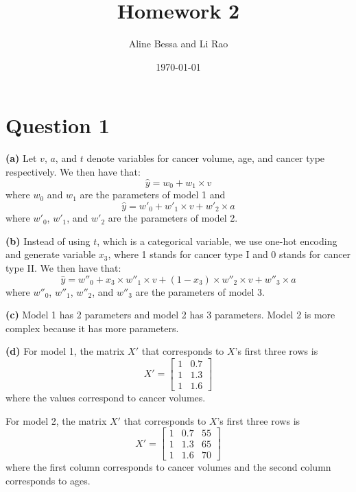 \documentclass[leqno]{article}
\title{Homework 2}
\author{Aline Bessa and Li Rao}
\date\today
\begin{document}
\maketitle %

\section*{Question 1}

\textbf{(a)} Let $v$, $a$, and $t$ denote variables for cancer volume, age, and cancer type respectively. We then have that:
\begin{equation*}
\hat{y} = w_0 + w_1 \times v
\end{equation*}
where $w_0$ and $w_1$ are the parameters of model 1 and
\begin{equation*}
\hat{y} = w'_0 + w'_1 \times v + w'_2 \times a
\end{equation*}
where $w'_0$, $w'_1$, and $w'_2$ are the parameters of model 2.

\hfill

\noindent \textbf{(b)} Instead of using $t$, which is a categorical variable, we use one-hot encoding and generate variable $x_3$, where 1 stands for cancer type I and 
0 stands for cancer type II. We then have that:
\begin{equation*}
\hat{y} = w''_0 + x_3 \times w''_1 \times v + (1 - x_3) \times w''_2 \times v  + w''_3 \times a 
\end{equation*}
where $w''_0$, $w''_1$, $w''_2$, and $w''_3$ are the parameters of model 3.

\hfill

\noindent \textbf{(c)} Model 1 has 2 parameters and model 2 has 3 parameters. Model 2 is more complex because it has more parameters.

\hfill

\noindent \textbf{(d)} For model 1, the matrix $X'$ that corresponds to $X$'s first three rows is
\[
X'=
  \begin{bmatrix}
    1 & 0.7 \\
    1 & 1.3 \\
    1 & 1.6
  \end{bmatrix}
\]
where the values correspond to cancer volumes.

\noindent For model 2, the matrix $X'$ that corresponds to $X$'s first three rows is
\[
X'=
  \begin{bmatrix}
    1 & 0.7 & 55 \\
    1 & 1.3 & 65 \\
    1 & 1.6 & 70
  \end{bmatrix}
\]
where the first column corresponds to cancer volumes and the second column corresponds to ages.
\end{document}
